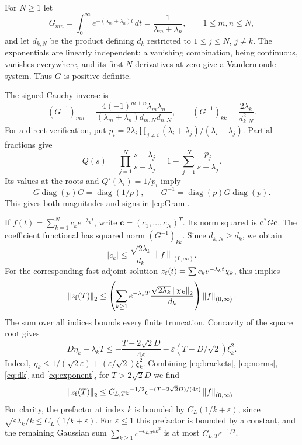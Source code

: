 \documentclass[11pt]{article}
\numberwithin{equation}{section}
\newcommand{\eps}{\varepsilon}
\newcommand{\norm}[1]{\left\|#1\right\|}
\begin{document}
For $N\ge1$ let
\[
 G_{mn}=\int_0^\infty e^{-(\lambda_m+\lambda_n)t}\,dt
       =\frac1{\lambda_m+\lambda_n},\qquad 1\le m,n\le N,
\]
and let $d_{k,N}$ be the product defining $d_k$ restricted to
$1\le j\le N$, $j\ne k$.
The exponentials are linearly independent: a vanishing combination,
being continuous, vanishes everywhere, and its first $N$ derivatives
at zero give a Vandermonde system. Thus $G$ is positive definite.

The signed Cauchy inverse is
\begin{equation}\label{eq:Gram}
 (G^{-1})_{mn}
  =\frac{4(-1)^{m+n}\lambda_m\lambda_n}
   {(\lambda_m+\lambda_n)d_{m,N}d_{n,N}},\qquad
 (G^{-1})_{kk}=\frac{2\lambda_k}{d_{k,N}^2}.
\end{equation}
For a direct verification, put
$p_i=2\lambda_i\prod_{j\ne i}(\lambda_i+\lambda_j)/
(\lambda_i-\lambda_j)$.
Partial fractions give
\[
 Q(s)=\prod_{j=1}^N\frac{s-\lambda_j}{s+\lambda_j}
       =1-\sum_{j=1}^N\frac{p_j}{s+\lambda_j}.
\]
Its values at the roots and $Q'(\lambda_i)=1/p_i$ imply
\[
 G\operatorname{diag}(p)G=\operatorname{diag}(1/p),\qquad
 G^{-1}=\operatorname{diag}(p)G\operatorname{diag}(p).
\]
This gives both magnitudes and signs in \eqref{eq:Gram}.

If $f(t)=\sum_{k=1}^N c_ke^{-\lambda_kt}$, write
$\boldsymbol c=(c_1,\ldots,c_N)^T$.
Its norm squared is $\boldsymbol c^*G\boldsymbol c$.
The coefficient functional has squared norm $(G^{-1})_{kk}$.
Since $d_{k,N}\ge d_k$, we obtain
\[
 |c_k|\le\frac{\sqrt{2\lambda_k}}{d_k}\norm f_{(0,\infty)}.
\]
For the corresponding fast adjoint solution
$z_{\rm f}(t)=\sum c_ke^{-\lambda_kt}\chi_k$, this implies
\begin{equation}\label{eq:fast-terminal}
 \norm{z_{\rm f}(T)}_2\le
 \left(\sum_{k\ge1}e^{-\lambda_kT}
              \frac{\sqrt{2\lambda_k}\norm{\chi_k}_2}{d_k}\right)
                     \norm f_{(0,\infty)}.
\end{equation}
The sum over all indices bounds every finite truncation.
Concavity of the square root gives
\begin{equation}\label{eq:exponent}
 D\eta_k-\lambda_kT
 \le-\frac{T-2\sqrt2D}{4\eps}
       -\eps(T-D/\sqrt2)\xi_k^2.
\end{equation}
Indeed, $\eta_k\le1/(\sqrt2\eps)+(\eps/\sqrt2)\xi_k^2$.
Combining \eqref{eq:brackets}, \eqref{eq:norms}, \eqref{eq:dk}
and \eqref{eq:exponent}, for $T>2\sqrt2D$ we find
\begin{equation}\label{eq:fast-upper}
 \norm{z_{\rm f}(T)}_2\le
 C_{L,T}\eps^{-1/2}
    e^{-(T-2\sqrt2D)/(4\eps)}\norm f_{(0,\infty)}.
\end{equation}
For clarity, the prefactor at index $k$ is bounded by
$C_L(1/k+\eps)$, since
$\sqrt{\eps\lambda_k}/k\le C_L(1/k+\eps)$.
For $\eps\le1$ this prefactor is bounded by a constant, and the
remaining Gaussian sum $\sum_{k\ge1}e^{-c_{L,T}\eps k^2}$
is at most $C_{L,T}\eps^{-1/2}$.
\end{document}
